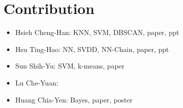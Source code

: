 \documentclass[twocolumn,10pt]{article}
\begin{document}
\section{Contribution}
\begin{itemize}
  \item Hsieh Cheng-Han: KNN, SVM, DBSCAN, paper, ppt
  \item Hsu Ting-Hao: NN, SVDD, NN-Chain, paper, ppt
  \item Sun Shih-Yu: SVM, k-means, paper
  \item Lu Che-Yuan: 
  \item Huang Chia-Yen: Bayes, paper, poster
\end{itemize}



\end{document}
